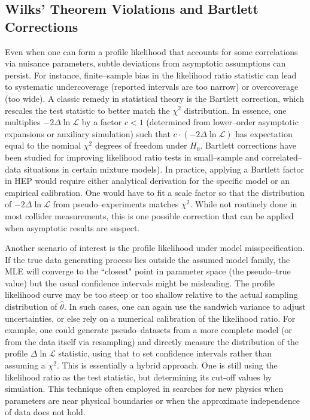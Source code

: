         \subsection{Wilks’ Theorem Violations and Bartlett Corrections}
            \label{subsec:bartlett-corrections}
            Even when one can form a profile likelihood that accounts for some correlations via nuisance parameters, subtle deviations from asymptotic assumptions can persist.
            For instance, finite--sample bias in the likelihood ratio statistic can lead to systematic undercoverage (reported intervals are too narrow) or overcoverage (too wide).
            A classic remedy in statistical theory is the Bartlett correction, which rescales the test statistic to better match the $\chi^2$ distribution.
            In essence, one multiplies $-2\Delta\ln\mathcal{L}$ by a factor $c < 1$ (determined from lower--order asymptotic expansions or auxiliary simulation) such that $c \cdot (-2\Delta\ln\mathcal{L})$ has expectation equal to the nominal $\chi^2$ degrees of freedom under $H_0$.
            Bartlett corrections have been studied for improving likelihood ratio tests in small--sample and correlated--data situations in certain mixture models).
            In practice, applying a Bartlett factor in HEP would require either analytical derivation for the specific model or an empirical calibration.
            One would have to fit a scale factor so that the distribution of $-2\Delta\ln\mathcal{L}$ from pseudo--experiments matches $\chi^2$.
            While not routinely done in most collider measurements, this is one possible  correction that can be applied when asymptotic results are suspect.

            Another scenario of interest is the profile likelihood under model misspecification.
            If the true data generating process lies outside the assumed model family, the MLE will converge to the ``closest" point in parameter space (the pseudo--true value) but the usual confidence intervals might be misleading. 
            The profile likelihood curve may be too steep or too shallow relative to the actual sampling distribution of $\hat{\theta}$.
            In such cases, one can again use the sandwich variance to adjust uncertainties, or else rely on a numerical calibration of the likelihood ratio.
            For example, one could generate pseudo--datasets from a more complete model (or from the data itself via resampling) and directly measure the distribution of the profile $\Delta\ln\mathcal{L}$ statistic, using that to set confidence intervals rather than assuming a $\chi^2$.
            This is essentially a hybrid approach.
            One is still using the likelihood ratio as the test statistic, but determining its cut-off values by simulation.
            This technique often employed in searches for new physics when parameters are near physical boundaries or when the approximate independence of data does not hold.

